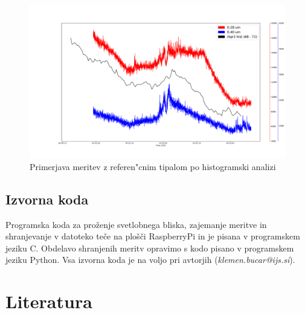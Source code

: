 \documentclass[11pt,a4paper]{article}
\begin{document}
\begin{figure}[H]
	\begin{center}
		\includegraphics[width=16cm]{hist_comparison.pdf}
		\caption{Primerjava meritev z referen"cnim tipalom po histogramski analizi}
		\label{hist_comparison}
	\end{center}
\end{figure}

\clearpage

\begin{appendices}
	\section{Izvorna koda}

Programska koda za proženje svetlobnega bliska, zajemanje meritve in shranjevanje v datoteko teče na plošči RaspberryPi in je pisana v programskem jeziku C.
Obdelavo shranjenih meritv opravimo s kodo pisano v programskem jeziku Python. 
Vsa izvorna koda je na voljo pri avtorjih (\emph{klemen.bucar@ijs.si}).


\end{appendices}
\clearpage

\section{Literatura}
\printbibliography[heading=none]
\end{document}
